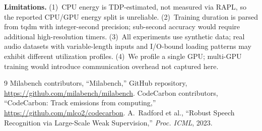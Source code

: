 \documentclass[10pt,twocolumn]{article}
\begin{document}
\textbf{Limitations.}
(1)~CPU energy is TDP-estimated, not measured via RAPL, so the reported CPU/GPU energy split is unreliable. (2)~Training duration is parsed from tqdm with integer-second precision; sub-second accuracy would require additional high-resolution timers. (3)~All experiments use synthetic data; real audio datasets with variable-length inputs and I/O-bound loading patterns may exhibit different utilization profiles. (4)~We profile a single GPU; multi-GPU training would introduce communication overhead not captured here.

\begin{thebibliography}{9}
 Milabench contributors, ``Milabench,'' GitHub repository, \url{https://github.com/milabench/milabench}.
 CodeCarbon contributors, ``CodeCarbon: Track emissions from computing,'' \url{https://github.com/mlco2/codecarbon}.
 A.~Radford et al., ``Robust Speech Recognition via Large-Scale Weak Supervision,'' \textit{Proc. ICML}, 2023.
\end{thebibliography}
\end{document}
